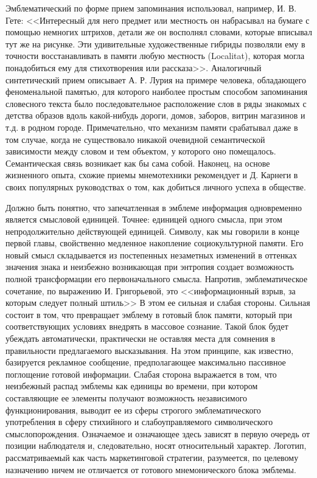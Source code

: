Эмблематический по форме прием запоминания использовал, например, И. В. Гете: <<Интересный для него
предмет или местность он набрасывал на бумаге с помощью немногих штрихов, детали же он восполнял
словами, которые вписывал тут же на рисунке. Эти удивительные художественные гибриды позволяли ему в
точности восстанавливать в памяти любую местность (Localitat), которая могла понадобиться ему для
стихотворения или рассказа>>. \autocite{bahtin1979}\autocite[][219]{bahtin1979full} Аналогичный
синтетический прием описывает А. Р. Лурия на примере человека, обладающего феноменальной памятью,
для которого наиболее простым способом запоминания словесного текста было последовательное
расположение слов в ряды знакомых с детства образов вдоль какой-нибудь дороги, домов, заборов,
витрин магазинов и т.д. в родном городе. \autocite[]{luria1979}
Примечательно, что механизм памяти срабатывал даже в том случае, когда не
существовало никакой очевидной семантической зависимости между словом и тем объектом, у которого оно
помещалось. Семантическая связь возникает как бы сама собой. Наконец, на основе жизненного опыта,
схожие приемы мнемотехники рекомендует и Д. Карнеги в своих популярных руководствах о том, как
добиться личного успеха в обществе. \autocite[][237--420]{karnegi1996}

Должно быть понятно, что запечатленная в эмблеме информация одновременно является смысловой
единицей. Точнее: единицей одного смысла, при этом непродолжительно действующей единицей.  Символу,
как мы говорили в конце первой главы, свойственно медленное накопление социокультурной памяти.  Его
новый смысл складывается из постепенных незаметных изменений в оттенках значения знака и неизбежно
возникающая при энтропия создает возможность полной трансформации его первоначального
смысла. Напротив, эмблематическое сочетание, по выражению И. Григорьевой, это <<информационный взрыв,
за которым следует полный штиль>> \autocite[][50]{grigoreva2005} В этом ее сильная и слабая стороны. Сильная
состоит в том, что превращает эмблему в готовый блок памяти, который при соответствующих условиях
внедрять в массовое сознание. Такой блок будет убеждать автоматически, практически не оставляя места
для сомнения в правильности предлагаемого высказывания. На этом принципе, как известно, базируется
рекламное сообщение, предполагающее максимально пассивное поглощение готовой информации.  Слабая
сторона выражается в том, что неизбежный распад эмблемы как единицы во времени, при котором
составляющие ее элементы получают возможность независимого функционирования, выводит ее из сферы
строгого эмблематического употребления в сферу стихийного и слабоуправляемого символического
смыслопорождения. Означаемое и означающее здесь зависят в первую очередь от позиции наблюдателя и,
следовательно, носят относительный характер. Логотип, рассматриваемый как часть маркетинговой
стратегии, разумеется, по целевому назначению ничем не отличается от готового мнемонического блока
эмблемы.

